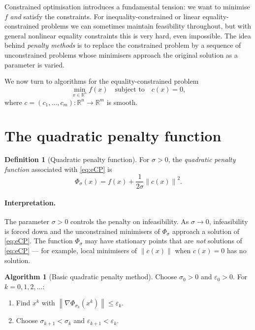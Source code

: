 \documentclass[11pt,a4paper]{report}
\theoremstyle{plain}
\theoremstyle{definition}
\newtheorem{definition}[theorem]{Definition}
\newtheorem{algorithm}[theorem]{Algorithm}
\newcommand{\R}{\mathbb{R}}
\newcommand{\norm}[1]{\left\lVert#1\right\rVert}
\newcommand{\grad}{\nabla}
\newcommand{\eps}{\varepsilon}
\begin{document}
Constrained optimisation introduces a fundamental tension: we want to minimise $f$
\emph{and} satisfy the constraints. For inequality-constrained or linear
equality-constrained problems we can sometimes maintain feasibility throughout,
but with general nonlinear equality constraints this is very hard, even
impossible. The idea behind \emph{penalty methods} is to replace the constrained
problem by a sequence of unconstrained problems whose minimisers approach the
original solution as a parameter is varied.

We now turn to algorithms for the equality-constrained problem
\begin{equation}\label{eq:eCP}\tag{eCP}
\min_{x\in\R^{n}} f(x)\quad\text{subject to}\quad c(x)=0,
\end{equation}
where $c=(c_{1},\dots,c_{m}):\R^{n}\to\R^{m}$ is smooth.

\section{The quadratic penalty function}

\begin{definition}[Quadratic penalty function]
For $\sigma>0$, the \emph{quadratic penalty function} associated with \eqref{eq:eCP} is
\begin{equation}\label{eq:Phi}
\Phi_{\sigma}(x)=f(x)+\frac{1}{2\sigma}\norm{c(x)}^{2}.
\end{equation}
\end{definition}

\paragraph{Interpretation.} The parameter $\sigma>0$ controls the penalty on
infeasibility. As $\sigma\to 0$, infeasibility is forced down and the unconstrained
minimisers of $\Phi_{\sigma}$ approach a solution of \eqref{eq:eCP}. The function
$\Phi_{\sigma}$ may have stationary points that are \emph{not} solutions of
\eqref{eq:eCP} — for example, local minimisers of $\norm{c(x)}$ when $c(x)=0$ has
no solution.

\begin{algorithm}[Basic quadratic penalty method]\label{alg:penalty}
Choose $\sigma_{0}>0$ and $\eps_{0}>0$. For $k=0,1,2,\dots$:
\begin{enumerate}[leftmargin=2em,itemsep=0pt]
  \item Find $x^{k}$ with $\norm{\grad\Phi_{\sigma_{k}}(x^{k})}\le\eps_{k}$.
  \item Choose $\sigma_{k+1}<\sigma_{k}$ and $\eps_{k+1}<\eps_{k}$.
\end{enumerate}
\end{algorithm}
\end{document}
